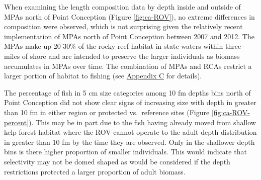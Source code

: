 \documentclass[11pt,
  english,
  a4paper,
]{article}
\begin{document}
\leavevmode\tagmcend\tagstructend\par


When examining the length composition data by depth inside and outside of MPAs north of Point Conception (Figure \ref{fig:ca-ROV}), no extreme differences in composition were observed, which is not surprising given the relatively recent implementation of MPAs north of Point Conception between 2007 and 2012. The MPAs make up 20-30\% of the rocky reef habitat in state waters within three miles of shore and are intended to preserve the larger individuals as biomass accumulates in MPAs over time. The combination of MPAs and RCAs restrict a larger portion of habitat to fishing (see {\protect\hyperlink{append_c}{Appendix C}\leavevmode\tagmcend\tagstructend} for details).

\leavevmode\tagmcend\tagstructend\par


The percentage of fish in 5 cm size categories among 10 fm depths bins north of Point Conception did not show clear signs of increasing size with depth in greater than 10 fm in either region or protected vs.~reference sites (Figure \ref{fig:ca-ROV-percent}). This may be in part due to the fish having already moved from shallow kelp forest habitat where the ROV cannot operate to the adult depth distribution in greater than 10 fm by the time they are observed. Only in the shallower depth bins is there higher proportion of smaller individuals. This would indicate that selectivity may not be domed shaped as would be considered if the depth restrictions protected a larger proportion of adult biomass.

\leavevmode\tagmcend\tagstructend\par

\begingroup\fontsize{10}{12}\selectfont
\begingroup\fontsize{10}{12}\selectfont
\end{document}
